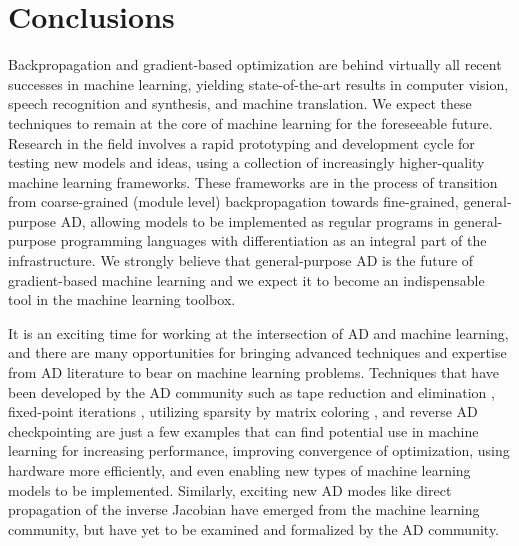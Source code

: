 \documentclass[twoside,11pt]{article}
\begin{document}
\section{Conclusions}
\label{SectionConclusions}
Backpropagation and gradient-based optimization are behind virtually all recent successes in machine learning, yielding state-of-the-art results in computer vision, speech recognition and synthesis, and machine translation. We expect these techniques to remain at the core of machine learning for the foreseeable future. Research in the field involves a rapid prototyping and development cycle for testing new models and ideas, using a collection of increasingly higher-quality machine learning frameworks. These frameworks are in the process of transition from coarse-grained (module level) backpropagation towards fine-grained, general-purpose AD, allowing models to be implemented as regular programs in general-purpose programming languages with differentiation as an integral part of the infrastructure. We strongly believe that general-purpose AD is the future of gradient-based machine learning and we expect it to become an indispensable tool in the machine learning toolbox.

It is an exciting time for working at the intersection of AD and machine learning, and there are many opportunities for bringing advanced techniques and expertise from AD literature to bear on machine learning problems. Techniques that have been developed by the AD community such as tape reduction and elimination \citep{naumann2004optimal}, fixed-point iterations \citep{christianson1994reverse}, utilizing sparsity by matrix coloring \citep{Gebremedhin2009,gebremedhin2013colpack}, and reverse AD checkpointing \citep{Dauvergne2006} are just a few examples that can find potential use in machine learning for increasing performance, improving convergence of optimization, using hardware more efficiently, and even enabling new types of machine learning models to be implemented. Similarly, exciting new AD modes like direct propagation of the inverse Jacobian \citep{srinivasan-todorov-2015a} have emerged from the machine learning community, but have yet to be examined and formalized by the AD community.
\end{document}
